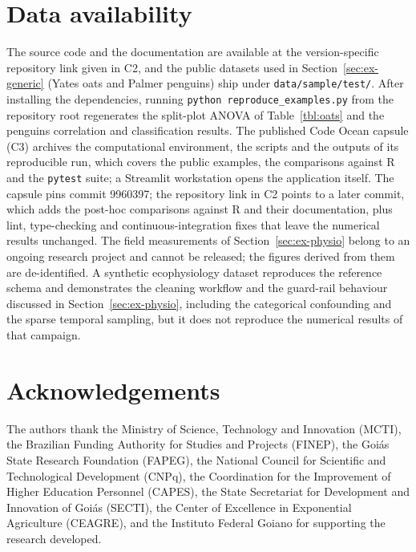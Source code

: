 \documentclass[11pt, letterpaper]{article}
\begin{document}
\section*{Data availability}
The source code and the documentation are available at the version-specific repository link given in C2, and the public datasets used in Section~\ref{sec:ex-generic} (Yates oats and Palmer penguins) ship under \texttt{data/sample/test/}. After installing the dependencies, running \texttt{python reproduce\_examples.py} from the repository root regenerates the split-plot ANOVA of Table~\ref{tbl:oats} and the penguins correlation and classification results. The published Code Ocean capsule (C3) archives the computational environment, the scripts and the outputs of its reproducible run, which covers the public examples, the comparisons against R and the \texttt{pytest} suite; a Streamlit workstation opens the application itself. The capsule pins commit 9960397; the repository link in C2 points to a later commit, which adds the post-hoc comparisons against R and their documentation, plus lint, type-checking and continuous-integration fixes that leave the numerical results unchanged. The field measurements of Section~\ref{sec:ex-physio} belong to an ongoing research project and cannot be released; the figures derived from them are de-identified. A synthetic ecophysiology dataset reproduces the reference schema and demonstrates the cleaning workflow and the guard-rail behaviour discussed in Section~\ref{sec:ex-physio}, including the categorical confounding and the sparse temporal sampling, but it does not reproduce the numerical results of that campaign.

\section*{Acknowledgements}

The authors thank the Ministry of Science, Technology and Innovation (MCTI), the Brazilian Funding Authority for Studies and Projects (FINEP), the Goi\'as State Research Foundation (FAPEG), the National Council for Scientific and Technological Development (CNPq), the Coordination for the Improvement of Higher Education Personnel (CAPES), the State Secretariat for Development and Innovation of Goi\'as (SECTI), the Center of Excellence in Exponential Agriculture (CEAGRE), and the Instituto Federal Goiano for supporting the research developed.

\end{document}
